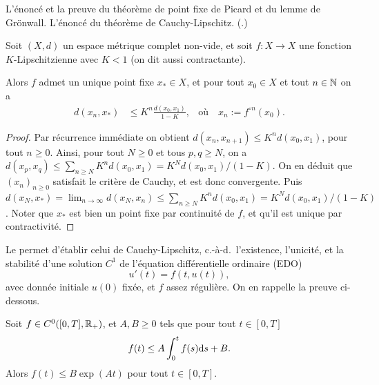 \begin{retenir}
L'énoncé et la preuve du théorème de point fixe de Picard et du lemme de Grönwall. L'énoncé du théorème de Cauchy-Lipschitz. 
(.)	
\end{retenir}

\begin{theorem}
\label{th:fixe_Picard}
%
	Soit $(X,d)$ un espace métrique complet non-vide, et soit $f : X \to X$ une fonction $K$-Lipschitzienne avec $K<1$ (on dit aussi contractante). 
	
	Alors $f$ admet un unique point fixe $x_* \in X$, et pour tout $x_0 \in X$ et tout $n \in \mathbb{N}$ on a 
	\begin{align}
		d(x_n,x_*) &\leq K^n \frac{d(x_0,x_1)}{1-K},&
		\text{où} \quad x_n := f^{\circ n}(x_0).
	\end{align}
\end{theorem}

\begin{proof}
Par récurrence immédiate on obtient $d(x_n,x_{n+1}) \leq K^n d(x_0,x_1)$, pour tout $n \geq 0$. Ainsi, pour tout $N \geq 0$ et tous $p,q\geq N$, on a  $d(x_p,x_q) \leq \sum_{n\geq N} K^n d(x_0,x_1) = K^N d(x_0,x_1)/(1-K)$. On en déduit que $(x_n)_{n \geq 0}$ satisfait le critère de Cauchy, et est donc convergente. Puis $d(x_N,x_*) = \lim_{n \to \infty} d(x_N,x_n) \leq \sum_{n\geq N} K^n d(x_0,x_1) = K^N d(x_0,x_1)/(1-K)$. Noter que $x_*$ est bien un point fixe par continuité de $f$, et qu'il est unique par contractivité.
\end{proof}

Le  permet d'établir celui de Cauchy-Lipschitz, c.-à-d.\ l'existence, l'unicité, et la stabilité d'une solution $C^1$ de l'équation différentielle ordinaire (EDO)
\begin{equation}
\label{eq:EDO}
	u'(t)=f(t,u(t)),
\end{equation}
avec donnée initiale $u(0)$ fixée, et $f$ assez régulière. On en rappelle la preuve ci-dessous.

\begin{lemma}[Grönwall]
\label{lem:Gronwall}
%
	Soit $f \in C^0([0,T], \mathbb{R}_+)$, et $A,B \geq 0$ tels que pour tout $t \in [0,T]$
	\begin{equation}
		f(t) \leq A \int_0^t f(s) \mathrm{d} s + B.	
	\end{equation}
	Alors $f(t) \leq B \exp(A t)$ pour tout $t \in [0,T]$. 
\end{lemma}

